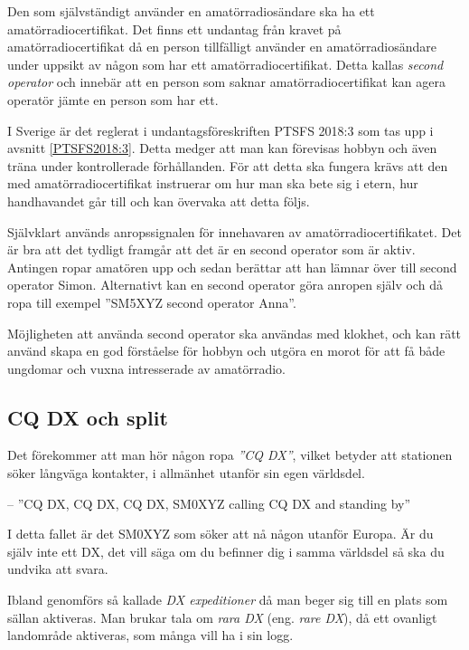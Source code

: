 Den som självständigt använder en amatörradiosändare ska ha ett
amatörradiocertifikat.
Det finns ett undantag från kravet på amatörradiocertifikat då en person
tillfälligt använder en amatörradiosändare under uppsikt av någon som har ett
amatörradiocertifikat.
Detta kallas \emph{second operator} och innebär att en person som saknar
amatörradiocertifikat kan agera operatör jämte en person som har ett.

I Sverige är det reglerat i undantagsföreskriften PTSFS 2018:3 som tas upp i
avsnitt \ref{PTSFS2018:3}.
Detta medger att man kan förevisas hobbyn och även träna under kontrollerade
förhållanden.
För att detta ska fungera krävs att den med amatörradiocertifikat instruerar
om hur man ska bete sig i etern, hur handhavandet går till och kan övervaka
att detta följs.

Självklart används anropssignalen för innehavaren av amatörradiocertifikatet.
Det är bra att det tydligt framgår att det är en second operator som är aktiv.
Antingen ropar amatören upp och sedan berättar att han lämnar över till second
operator Simon.
Alternativt kan en second operator göra anropen själv och då ropa till exempel
''SM5XYZ second operator Anna''.

Möjligheten att använda second operator ska användas med klokhet, och kan rätt
använd skapa en god förståelse för hobbyn och utgöra en morot för att få både
ungdomar och vuxna intresserade av amatörradio.

\newpage %
\subsection{CQ DX och split}
\label{cq dx och split}

Det förekommer att man hör någon ropa \emph{''CQ DX''}, vilket betyder att
stationen söker långväga kontakter, i allmänhet utanför sin egen världsdel.

-- ''CQ DX, CQ DX, CQ DX, SM0XYZ calling CQ DX and standing by''

I detta fallet är det SM0XYZ som söker att nå någon utanför Europa.
Är du själv inte ett DX, det vill säga om du befinner dig i samma världsdel så
ska du undvika att svara.

Ibland genomförs så kallade \emph{DX expeditioner} då man beger sig till en
plats som sällan aktiveras.
Man brukar tala om \emph{rara DX} (eng. \emph{rare DX}), då ett ovanligt
landområde aktiveras, som många vill ha i sin logg.

